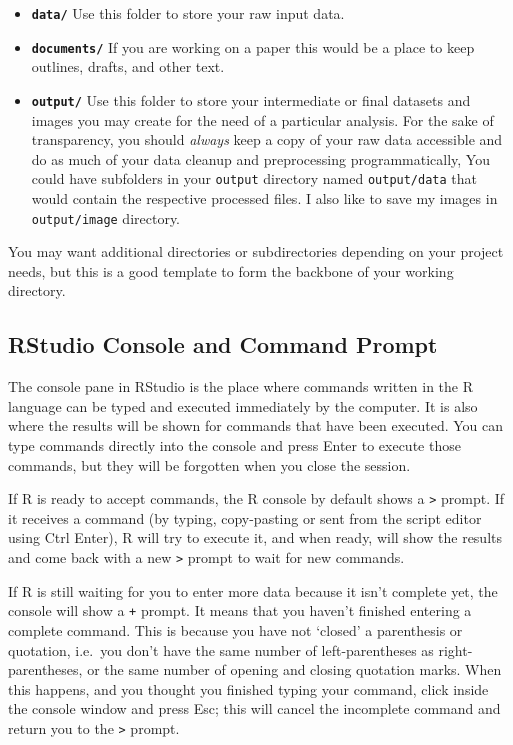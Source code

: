 \documentclass[
]{book}
\providecommand{\tightlist}{%
  \setlength{\itemsep}{0pt}\setlength{\parskip}{0pt}}
\begin{document}
\begin{itemize}
\tightlist
\item
  \textbf{\texttt{data/}} Use this folder to store your raw input data.
\item
  \textbf{\texttt{documents/}} If you are working on a paper this would be a place
  to keep outlines, drafts, and other text.
\item
  \textbf{\texttt{output/}} Use this folder to store your intermediate or final
  datasets and images you may create for the need of a particular
  analysis. For the sake of transparency, you should \emph{always} keep a
  copy of your raw data accessible and do as much of your data cleanup
  and preprocessing programmatically, You could have subfolders in
  your \texttt{output} directory named \texttt{output/data} that would contain the
  respective processed files. I also like to save my images in
  \texttt{output/image} directory.
\end{itemize}

You may want additional directories or subdirectories depending on your
project needs, but this is a good template to form the backbone of your
working directory.

\hypertarget{rstudio-console-and-command-prompt}{%
\subsection{RStudio Console and Command Prompt}\label{rstudio-console-and-command-prompt}}

The console pane in RStudio is the place where commands written in the R
language can be typed and executed immediately by the computer. It is
also where the results will be shown for commands that have been
executed. You can type commands directly into the console and press
Enter to execute those commands, but they will be forgotten
when you close the session.

If R is ready to accept commands, the R console by default shows a \texttt{\textgreater{}}
prompt. If it receives a command (by typing, copy-pasting or sent from
the script editor using Ctrl Enter), R will try to execute
it, and when ready, will show the results and come back with a new \texttt{\textgreater{}}
prompt to wait for new commands.

If R is still waiting for you to enter more data because it isn't
complete yet, the console will show a \texttt{+} prompt. It means that you
haven't finished entering a complete command. This is because you have
not `closed' a parenthesis or quotation, i.e.~you don't have the same
number of left-parentheses as right-parentheses, or the same number of
opening and closing quotation marks. When this happens, and you thought
you finished typing your command, click inside the console window and
press Esc; this will cancel the incomplete command and return
you to the \texttt{\textgreater{}} prompt.
\end{document}
